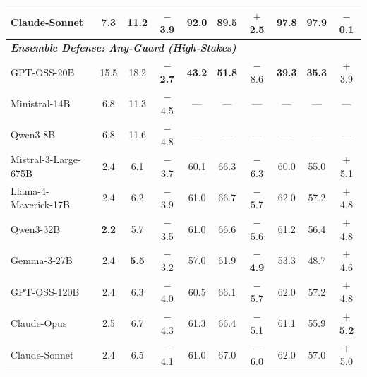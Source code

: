 \begin{table}[t]
{\begin{tabular}{l ccc ccc ccc}
Claude-Sonnet & 7.3 & 11.2 & $-$3.9 & 92.0 & 89.5 & $+$2.5 & 97.8 & 97.9 & $-$0.1 \\
\midrule
\multicolumn{10}{l}{\textbf{\textit{Ensemble Defense: Any-Guard (High-Stakes)}}} \\
GPT-OSS-20B & 15.5 & 18.2 & \textbf{$-$2.7} & \textbf{43.2} & \textbf{51.8} & $-$8.6 & \textbf{39.3} & \textbf{35.3} & $+$3.9 \\
Ministral-14B & 6.8 & 11.3 & $-$4.5 & --- & --- & --- & --- & --- & --- \\
Qwen3-8B & 6.8 & 11.6 & $-$4.8 & --- & --- & --- & --- & --- & --- \\
Mistral-3-Large-675B & 2.4 & 6.1 & $-$3.7 & 60.1 & 66.3 & $-$6.3 & 60.0 & 55.0 & $+$5.1 \\
Llama-4-Maverick-17B & 2.4 & 6.2 & $-$3.9 & 61.0 & 66.7 & $-$5.7 & 62.0 & 57.2 & $+$4.8 \\
Qwen3-32B & \textbf{2.2} & 5.7 & $-$3.5 & 61.0 & 66.6 & $-$5.6 & 61.2 & 56.4 & $+$4.8 \\
Gemma-3-27B & 2.4 & \textbf{5.5} & $-$3.2 & 57.0 & 61.9 & \textbf{$-$4.9} & 53.3 & 48.7 & $+$4.6 \\
GPT-OSS-120B & 2.4 & 6.3 & $-$4.0 & 60.5 & 66.1 & $-$5.7 & 62.0 & 57.2 & $+$4.8 \\
Claude-Opus & 2.5 & 6.7 & $-$4.3 & 61.3 & 66.4 & $-$5.1 & 61.1 & 55.9 & \textbf{$+$5.2} \\
Claude-Sonnet & 2.4 & 6.5 & $-$4.1 & 61.0 & 67.0 & $-$6.0 & 62.0 & 57.0 & $+$5.0 \\
\bottomrule
\end{tabular}
}
\end{table}